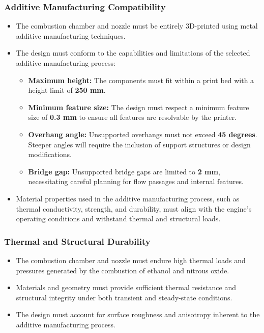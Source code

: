 \subsubsection{Additive Manufacturing Compatibility}
\begin{itemize}
    \item The combustion chamber and nozzle must be entirely 3D-printed using metal additive manufacturing techniques.
    \item The design must conform to the capabilities and limitations of the selected additive manufacturing process:
    \begin{itemize}
        \item \textbf{Maximum height:} The components must fit within a print bed with a height limit of \textbf{250 mm}.
        \item \textbf{Minimum feature size:} The design must respect a minimum feature size of \textbf{0.3 mm} to ensure all features are resolvable by the printer.
        \item \textbf{Overhang angle:} Unsupported overhangs must not exceed \textbf{45 degrees}. Steeper angles will require the inclusion of support structures or design modifications.
        \item \textbf{Bridge gap:} Unsupported bridge gaps are limited to \textbf{2 mm}, necessitating careful planning for flow passages and internal features.
    \end{itemize}
    \item Material properties used in the additive manufacturing process, such as thermal conductivity, strength, and durability, must align with the engine’s operating conditions and withstand thermal and structural loads.
\end{itemize}

\subsubsection{Thermal and Structural Durability}
\begin{itemize}
    \item The combustion chamber and nozzle must endure high thermal loads and pressures generated by the combustion of ethanol and nitrous oxide.
    \item Materials and geometry must provide sufficient thermal resistance and structural integrity under both transient and steady-state conditions.
    \item The design must account for surface roughness and anisotropy inherent to the additive manufacturing process.
\end{itemize}

